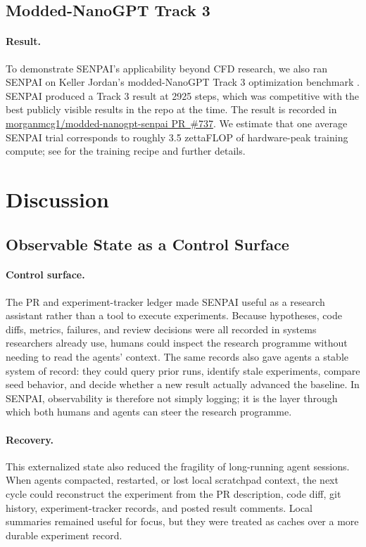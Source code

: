 \documentclass{article}
\begin{document}
\subsection{Modded-NanoGPT Track 3}

\paragraph{Result.}
To demonstrate SENPAI's applicability beyond CFD research, we also ran SENPAI on Keller Jordan's modded-NanoGPT Track 3 optimization benchmark \citep{jordan2026moddednanogpttrack3}. SENPAI produced a Track 3 result at 2925 steps, which was competitive with the best publicly visible results in the repo at the time. The result is recorded in \href{https://github.com/morganmcg1/modded-nanogpt-senpai/pull/737}{morganmcg1/modded-nanogpt-senpai PR~\#737}. We estimate that one average SENPAI trial corresponds to roughly 3.5 zettaFLOP of hardware-peak training compute; see  for the training recipe and further details.

\section{Discussion}

\subsection{Observable State as a Control Surface}

\paragraph{Control surface.}
The PR and experiment-tracker ledger made SENPAI useful as a research assistant rather than a tool to execute experiments. Because hypotheses, code diffs, metrics, failures, and review decisions were all recorded in systems researchers already use, humans could inspect the research programme without needing to read the agents' context. The same records also gave agents a stable system of record: they could query prior runs, identify stale experiments, compare seed behavior, and decide whether a new result actually advanced the baseline. In SENPAI, observability is therefore not simply logging; it is the layer through which both humans and agents can steer the research programme.

\paragraph{Recovery.}
This externalized state also reduced the fragility of long-running agent sessions. When agents compacted, restarted, or lost local scratchpad context, the next cycle could reconstruct the experiment from the PR description, code diff, git history, experiment-tracker records, and posted result comments. Local summaries remained useful for focus, but they were treated as caches over a more durable experiment record.
\end{document}

